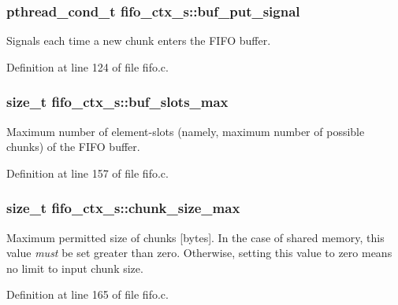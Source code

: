 \subsubsection[{\texorpdfstring{buf\+\_\+put\+\_\+signal}{buf_put_signal}}]{\setlength{\rightskip}{0pt plus 5cm}pthread\+\_\+cond\+\_\+t fifo\+\_\+ctx\+\_\+s\+::buf\+\_\+put\+\_\+signal}\hypertarget{structfifo__ctx__s_a3f9e6f9e1505a9f7e1756c212602a9df}{}\label{structfifo__ctx__s_a3f9e6f9e1505a9f7e1756c212602a9df}
Signals each time a new chunk enters the F\+I\+FO buffer. 

Definition at line 124 of file fifo.\+c.

\subsubsection[{\texorpdfstring{buf\+\_\+slots\+\_\+max}{buf_slots_max}}]{\setlength{\rightskip}{0pt plus 5cm}size\+\_\+t fifo\+\_\+ctx\+\_\+s\+::buf\+\_\+slots\+\_\+max}\hypertarget{structfifo__ctx__s_a9e7f97c83e08c4dff68c1f4dedb25537}{}\label{structfifo__ctx__s_a9e7f97c83e08c4dff68c1f4dedb25537}
Maximum number of element-\/slots (namely, maximum number of possible chunks) of the F\+I\+FO buffer. 

Definition at line 157 of file fifo.\+c.

\subsubsection[{\texorpdfstring{chunk\+\_\+size\+\_\+max}{chunk_size_max}}]{\setlength{\rightskip}{0pt plus 5cm}size\+\_\+t fifo\+\_\+ctx\+\_\+s\+::chunk\+\_\+size\+\_\+max}\hypertarget{structfifo__ctx__s_ab67621fb3c666a07ada8a20d03e3c26c}{}\label{structfifo__ctx__s_ab67621fb3c666a07ada8a20d03e3c26c}
Maximum permitted size of chunks \mbox{[}bytes\mbox{]}. In the case of shared memory, this value {\itshape must} be set greater than zero. Otherwise, setting this value to zero means no limit to input chunk size. 

Definition at line 165 of file fifo.\+c.

